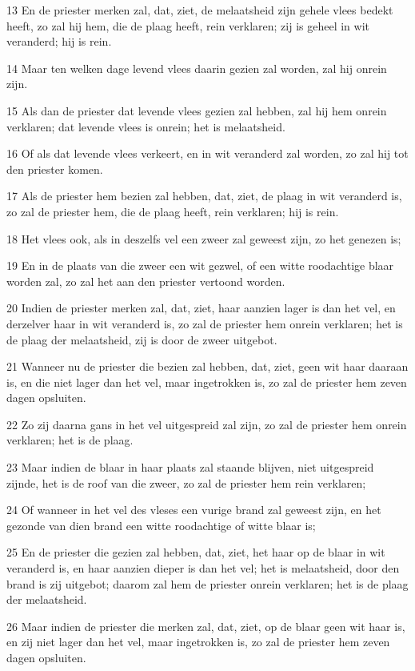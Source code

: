 \par 13 En de priester merken zal, dat, ziet, de melaatsheid zijn gehele vlees bedekt heeft, zo zal hij hem, die de plaag heeft, rein verklaren; zij is geheel in wit veranderd; hij is rein.
\par 14 Maar ten welken dage levend vlees daarin gezien zal worden, zal hij onrein zijn.
\par 15 Als dan de priester dat levende vlees gezien zal hebben, zal hij hem onrein verklaren; dat levende vlees is onrein; het is melaatsheid.
\par 16 Of als dat levende vlees verkeert, en in wit veranderd zal worden, zo zal hij tot den priester komen.
\par 17 Als de priester hem bezien zal hebben, dat, ziet, de plaag in wit veranderd is, zo zal de priester hem, die de plaag heeft, rein verklaren; hij is rein.
\par 18 Het vlees ook, als in deszelfs vel een zweer zal geweest zijn, zo het genezen is;
\par 19 En in de plaats van die zweer een wit gezwel, of een witte roodachtige blaar worden zal, zo zal het aan den priester vertoond worden.
\par 20 Indien de priester merken zal, dat, ziet, haar aanzien lager is dan het vel, en derzelver haar in wit veranderd is, zo zal de priester hem onrein verklaren; het is de plaag der melaatsheid, zij is door de zweer uitgebot.
\par 21 Wanneer nu de priester die bezien zal hebben, dat, ziet, geen wit haar daaraan is, en die niet lager dan het vel, maar ingetrokken is, zo zal de priester hem zeven dagen opsluiten.
\par 22 Zo zij daarna gans in het vel uitgespreid zal zijn, zo zal de priester hem onrein verklaren; het is de plaag.
\par 23 Maar indien de blaar in haar plaats zal staande blijven, niet uitgespreid zijnde, het is de roof van die zweer, zo zal de priester hem rein verklaren;
\par 24 Of wanneer in het vel des vleses een vurige brand zal geweest zijn, en het gezonde van dien brand een witte roodachtige of witte blaar is;
\par 25 En de priester die gezien zal hebben, dat, ziet, het haar op de blaar in wit veranderd is, en haar aanzien dieper is dan het vel; het is melaatsheid, door den brand is zij uitgebot; daarom zal hem de priester onrein verklaren; het is de plaag der melaatsheid.
\par 26 Maar indien de priester die merken zal, dat, ziet, op de blaar geen wit haar is, en zij niet lager dan het vel, maar ingetrokken is, zo zal de priester hem zeven dagen opsluiten.
